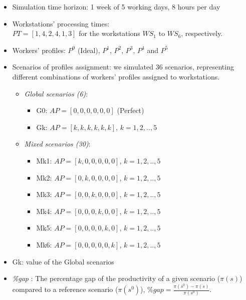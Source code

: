\documentclass[review,12pt, 3p, times]{elsarticle}
\begin{document}
\begin{itemize}
	\item Simulation time horizon: 1 week of 5 working days, 8 hours per day
	\item Workstations' processing times:\\ $PT=[1,4,2,4,1,3]$ for the workstations $\textit{WS}_1$ to $\textit{WS}_6$, respectively.
	\item Workers' profiles: $P^0$ (Ideal), $P^1$, $P^2$, $P^3$, $P^4$ and $P^5$ 
	\item Scenarios of profiles assignment: we simulated 36 scenarios, representing  different combinations of workers' profiles assigned to workstations.\\
 \begin{itemize}
    \item  \textit{Global scenarios (6)}:
    \begin{itemize}
        \item 	      \hspace*{0.5cm} G0: $AP=[0,0,0,0,0,0]$ (Perfect)
	\item    \hspace*{0.5cm} Gk: $AP=[k,k,k,k,k,k]$, $k=1,2,..,5$ 
    \end{itemize}

    \item  \textit{Mixed scenarios (30)}: 
    \begin{itemize}
        \item 	  \hspace*{0.5cm} Mk1: $AP=[k,0,0,0,0,0]$, $k=1,2,..,5$
	\item     \hspace*{0.5cm} Mk2: $AP=[0,k,0,0,0,0]$, $k=1,2,..,5$
	  \item    \hspace*{0.5cm} Mk3: $AP=[0,0,k,0,0,0]$, $k=1,2,..,5$
	  \item    \hspace*{0.5cm} Mk4: $AP=[0,0,0,k,0,0]$, $k=1,2,..,5$
	  \item    \hspace*{0.5cm} Mk5: $AP=[0,0,0,0,k,0]$, $k=1,2,..,5$
	  \item    \hspace*{0.5cm} Mk6: $AP=[0,0,0,0,0,k]$, $k=1,2,..,5$
    \end{itemize}

 \end{itemize}
	     
	\item Gk: value of the Global scenarios
	\item {\it{\%gap}}  :  The percentage gap of the productivity of a given scenario ($\pi(s)$) compared to a reference scenario ($\pi(s^0)$),  $\textit{\%gap}=\frac{\pi(s^0) - \pi(s)}{\pi(s^0)}$.
\end{itemize}
\end{document}
